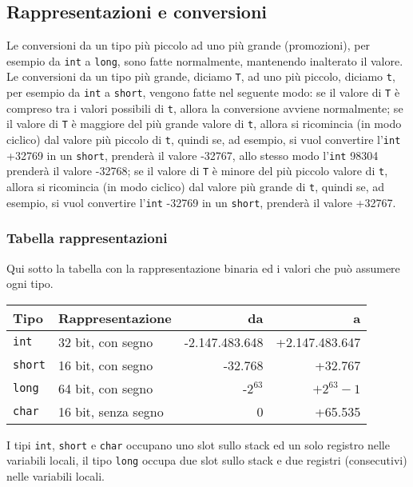 \subsection{Rappresentazioni e conversioni}
\label{sec:rappresentazioni_e_conversioni}
Le conversioni da un tipo pi\`u piccolo ad uno pi\`u grande (promozioni), per esempio da \texttt{int} a \texttt{long}, sono fatte normalmente, mantenendo inalterato il valore. Le conversioni da un tipo pi\`u grande, diciamo \texttt{T}, ad uno pi\`u piccolo, diciamo \texttt{t}, per esempio da \texttt{int} a \texttt{short}, vengono fatte nel seguente modo: se il valore di \texttt{T} \`e compreso tra i valori possibili di \texttt{t}, allora la conversione avviene normalmente; se il valore di \texttt{T} \`e maggiore del pi\`u grande valore di \texttt{t}, allora si ricomincia (in modo ciclico) dal valore pi\`u piccolo di \texttt{t}, quindi se, ad esempio, si vuol convertire l'\texttt{int} +32769 in un \texttt{short}, prender\`a il valore -32767, allo stesso modo l'\texttt{int} 98304 prender\`a il valore -32768; se il valore di \texttt{T} \`e minore del pi\`u piccolo valore di \texttt{t}, allora si ricomincia (in modo ciclico) dal valore pi\`u grande di \texttt{t}, quindi se, ad esempio, si vuol convertire l'\texttt{int} -32769 in un \texttt{short}, prender\`a il valore +32767.

\subsubsection*{Tabella rappresentazioni}
\label{sec:tabella_rappresentazioni}
Qui sotto la tabella con la rappresentazione binaria ed i valori che pu\`o assumere ogni tipo.

{\footnotesize
\begin{center}
\begin{tabular}{l l r r}
\toprule
\rowcolor[gray]{0.9}
  \textbf{Tipo} &
  \textbf{Rappresentazione} &
  \textbf{da} &
  \textbf{a} \\
\toprule
  \texttt{int} &
  32 bit, con segno &
  -2.147.483.648 &
  +2.147.483.647 \\
  \texttt{short} &
  16 bit, con segno &
  -32.768 &
  +32.767 \\
  \texttt{long} &
  64 bit, con segno &
  -$2^{63}$ &
  $+2^{63}-1$ \\
  \texttt{char} &
  16 bit, senza segno &
  0 &
  +65.535 \\
\bottomrule
\end{tabular}
\end{center}
} %

I tipi \texttt{int}, \texttt{short} e \texttt{char} occupano uno slot sullo stack ed un solo registro nelle variabili locali, il tipo \texttt{long} occupa due slot sullo stack e due registri (consecutivi) nelle variabili locali.
